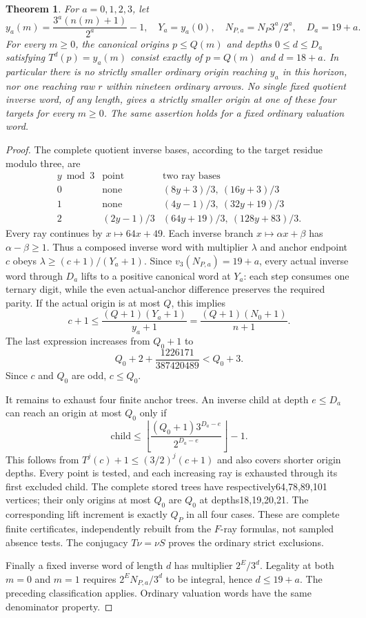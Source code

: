 \documentclass[11pt]{article}
\newtheorem{theorem}{Theorem}
\begin{document}
\begin{theorem}\label{thm:historycellscope}
For $a=0,1,2,3$, let
\[
 y_a(m)=\frac{3^a(n(m)+1)}{2^a}-1,\quad
 Y_a=y_a(0),\quad N_{P,a}=N_P3^a/2^a,\quad D_a=19+a.
\]
For every $m\ge0$, the canonical origins $p\le Q(m)$ and depths
$0\le d\le D_a$ satisfying $T^d(p)=y_a(m)$ consist exactly of
$p=Q(m)$ and $d=18+a$. In particular there is no strictly smaller
ordinary origin reaching $y_a$ in this horizon, nor one reaching raw
$r$ within nineteen ordinary arrows.
No single fixed quotient inverse word, of any length, gives a strictly
smaller origin at one of these four targets for every $m\ge0$.
The same assertion holds for a fixed ordinary valuation word.
\end{theorem}
\begin{proof}
The complete quotient inverse bases, according to the target residue
modulo three, are
\[
\begin{array}{c|c|c}
 y\bmod3&\text{point}&\text{two ray bases}\\ \hline
 0&\text{none}&(8y+3)/3,\ (16y+3)/3\\
 1&\text{none}&(4y-1)/3,\ (32y+19)/3\\
 2&(2y-1)/3&(64y+19)/3,\ (128y+83)/3.
\end{array}
\]
Every ray continues by $x\mapsto64x+49$. Each inverse branch
$x\mapsto\alpha x+\beta$ has $\alpha-\beta\ge1$. Thus a composed
inverse word with multiplier $\lambda$ and anchor endpoint $c$ obeys
$\lambda\ge(c+1)/(Y_a+1)$. Since $v_3(N_{P,a})=19+a$, every
actual inverse word through $D_a$ lifts to a positive canonical word
at $Y_a$: each step consumes one ternary digit, while the even
actual-anchor difference preserves the required parity.
If the actual origin is at most $Q$, this implies
\[
 c+1\le\frac{(Q+1)(Y_a+1)}{y_a+1}
       =\frac{(Q+1)(N_0+1)}{n+1}.
\]
The last expression increases from $Q_0+1$ to
\[
 Q_0+2+\frac{1226171}{387420489}<Q_0+3.
\]
Since $c$ and $Q_0$ are odd, $c\le Q_0$.

It remains to exhaust four finite anchor trees. An inverse child at
depth $e\le D_a$ can reach an origin at most $Q_0$ only if
\[
 \text{child}\le
 \left\lfloor\frac{(Q_0+1)3^{D_a-e}}{2^{D_a-e}}\right\rfloor-1.
\]
This follows from $T^j(c)+1\le(3/2)^j(c+1)$ and also covers
shorter origin depths. Every point is tested, and each increasing ray
is exhausted through its first excluded child. The complete stored
trees have respectively64,78,89,101 vertices; their only origins
at most $Q_0$ are $Q_0$ at depths18,19,20,21. The corresponding
lift increment is exactly $Q_P$ in all four cases. These are complete
finite certificates, independently rebuilt from the $F$-ray formulas,
not sampled absence tests. The conjugacy $T\nu=\nu S$ proves the
ordinary strict exclusions.

Finally a fixed inverse word of length $d$ has multiplier $2^E/3^d$.
Legality at both $m=0$ and $m=1$ requires $2^EN_{P,a}/3^d$ to
be integral, hence $d\le19+a$. The preceding classification applies.
Ordinary valuation words have the same denominator property.
\end{proof}
\end{document}
